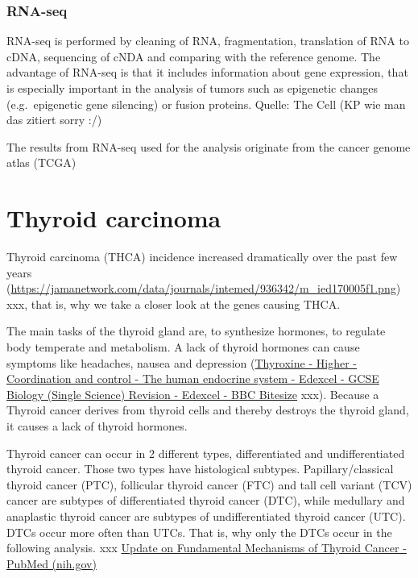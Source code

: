 \documentclass[
  parskip,
  oneside]{scrreprt}
\begin{document}
\hypertarget{rna-seq}{%
\subsubsection{RNA-seq}\label{rna-seq}}

RNA-seq is performed by cleaning of RNA, fragmentation, translation of
RNA to cDNA, sequencing of cNDA and comparing with the reference genome.
The advantage of RNA-seq is that it includes information about gene
expression, that is especially important in the analysis of tumors such
as epigenetic changes (e.g.~epigenetic gene silencing) or fusion
proteins. Quelle: The Cell (KP wie man das zitiert sorry :/)

The results from RNA-seq used for the analysis originate from the cancer
genome atlas (TCGA)

\hypertarget{thyroid-carcinoma}{%
\section{Thyroid carcinoma}\label{thyroid-carcinoma}}

Thyroid carcinoma (THCA) incidence increased dramatically over the past
few years
(\url{https://jamanetwork.com/data/journals/intemed/936342/m_ied170005f1.png})
xxx, that is, why we take a closer look at the genes causing THCA.

The main tasks of the thyroid gland are, to synthesize hormones, to
regulate body temperate and metabolism. A lack of thyroid hormones can
cause symptoms like headaches, nausea and depression
(\href{https://www.bbc.co.uk/bitesize/guides/z3gxb82/revision/3\#:~:text=Thyroxine\%20is\%20produced\%20from\%20the\%20thyroid\%20gland\%2C\%20which,development.\%20Its\%20levels\%20are\%20controlled\%20by\%20negative\%20feedback.}{Thyroxine
- Higher - Coordination and control - The human endocrine system -
Edexcel - GCSE Biology (Single Science) Revision - Edexcel - BBC
Bitesize} xxx). Because a Thyroid cancer derives from thyroid cells and
thereby destroys the thyroid gland, it causes a lack of thyroid
hormones.

Thyroid cancer can occur in 2 different types, differentiated and
undifferentiated thyroid cancer. Those two types have histological
subtypes. Papillary/classical thyroid cancer (PTC), follicular thyroid
cancer (FTC) and tall cell variant (TCV) cancer are subtypes of
differentiated thyroid cancer (DTC), while medullary and anaplastic
thyroid cancer are subtypes of undifferentiated thyroid cancer (UTC).
DTCs occur more often than UTCs. That is, why only the DTCs occur in the
following analysis. xxx
\href{https://pubmed.ncbi.nlm.nih.gov/32231639/}{Update on Fundamental
Mechanisms of Thyroid Cancer - PubMed (nih.gov)}
\end{document}
